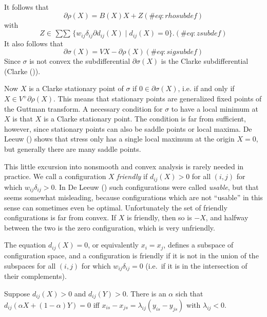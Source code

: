 \documentclass[
  12pt,
  letterpaper,
  DIV=11,
  numbers=noendperiod]{scrartcl}
\begin{document}
It follows that \begin{equation}
\partial\rho(X)=B(X)X+Z
(\#eq:rhosubdef)
\end{equation} with \begin{equation}
Z\in\mathop{\sum\sum}\{w_{ij}\delta_{ij}\partial d_{ij}(X)\mid d_{ij}(X)=0\}.
(\#eq:zsubdef)
\end{equation} It also follows that \begin{equation}
\partial\sigma(X)=VX-\partial\rho(X)
(\#eq:sigsubdef)
\end{equation} Since \(\sigma\) is not convex the subdifferential
\(\partial\sigma(X)\) is the Clarke subdifferential (Clarke
()).

Now \(X\) is a Clarke stationary point of \(\sigma\) if
\(0\in\partial\sigma(X)\), i.e. if and only if
\(X\in V^+\partial\rho(X)\). This means that stationary points are
generalized fixed points of the Guttman transform. A necessary condition
for \(\sigma\) to have a local minimum at \(X\) is that \(X\) is a
Clarke stationary point. The condition is far from sufficient, however,
since stationary points can also be saddle points or local maxima. De
Leeuw () shows that stress only has a
single local maximum at the origin \(X=0\), but generally there are many
saddle points.

This little excursion into nonsmooth and convex analysis is rarely
needed in practice. We call a configuration \(X\) \emph{friendly} if
\(d_{ij}(X)>0\) for all \((i,j)\) for which \(w_{ij}\delta_{ij}>0\). In
De Leeuw () such configurations were
called \emph{usable}, but that seems somewhat misleading, because
configurations which are not ``usable'' in this sense can sometimes even
be optimal. Unfortunately the set of friendly configurations is far from
convex. If \(X\) is friendly, then so is \(-X\), and halfway between the
two is the zero configuration, which is very unfriendly.

The equation \(d_{ij}(X)=0\), or equivalently \(x_i=x_j\), defines a
subspace of configuration space, and a configuration is friendly if it
is not in the union of the subspaces for all \((i,j)\) for which
\(w_{ij}\delta_{ij}=0\) (i.e.~if it is in the intersection of their
complements).

Suppose \(d_{ij}(X)>0\) and \(d_{ij}(Y)>0\). There is an \(\alpha\) sich
that \(d_{ij}(\alpha X+(1-\alpha)Y)=0\) iff
\(x_{is}-x_{js}=\lambda_{ij}(y_{is}-y_{js})\) with \(\lambda_{ij}<0\).
\end{document}
